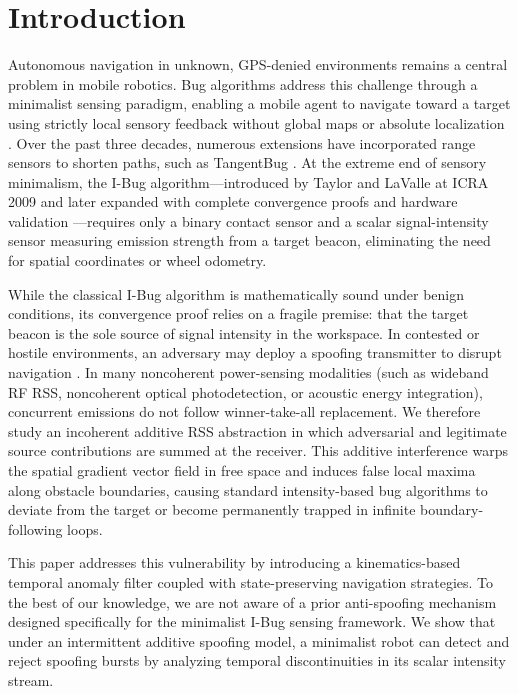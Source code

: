 \documentclass[12pt, a4paper]{article}
\begin{document}
\section{Introduction}
Autonomous navigation in unknown, GPS-denied environments remains a central problem in mobile robotics. Bug algorithms address this challenge through a minimalist sensing paradigm, enabling a mobile agent to navigate toward a target using strictly local sensory feedback without global maps or absolute localization \cite{lumelsky1987path}. Over the past three decades, numerous extensions have incorporated range sensors to shorten paths, such as TangentBug \cite{kamon1998tangentbug}. At the extreme end of sensory minimalism, the I-Bug algorithm—introduced by Taylor and LaValle at ICRA 2009 \cite{taylor2009ibug} and later expanded with complete convergence proofs and hardware validation \cite{taylor2014intensity}—requires only a binary contact sensor and a scalar signal-intensity sensor measuring emission strength from a target beacon, eliminating the need for spatial coordinates or wheel odometry.

While the classical I-Bug algorithm is mathematically sound under benign conditions, its convergence proof relies on a fragile premise: that the target beacon is the sole source of signal intensity in the workspace. In contested or hostile environments, an adversary may deploy a spoofing transmitter to disrupt navigation \cite{psiaki2016gnss, kerns2014unmanned}. In many noncoherent power-sensing modalities (such as wideband RF RSS, noncoherent optical photodetection, or acoustic energy integration), concurrent emissions do not follow winner-take-all replacement. We therefore study an incoherent additive RSS abstraction in which adversarial and legitimate source contributions are summed at the receiver. This additive interference warps the spatial gradient vector field in free space and induces false local maxima along obstacle boundaries, causing standard intensity-based bug algorithms to deviate from the target or become permanently trapped in infinite boundary-following loops.

This paper addresses this vulnerability by introducing a kinematics-based temporal anomaly filter coupled with state-preserving navigation strategies. To the best of our knowledge, we are not aware of a prior anti-spoofing mechanism designed specifically for the minimalist I-Bug sensing framework. We show that under an intermittent additive spoofing model, a minimalist robot can detect and reject spoofing bursts by analyzing temporal discontinuities in its scalar intensity stream.
\end{document}
